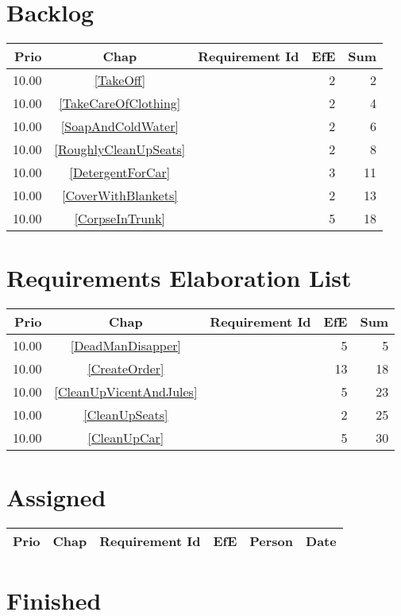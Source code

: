 \section{Backlog}
\begin{longtable}{|r|c|p{7cm}||r|r|} \hline
\textbf{Prio} & \textbf{Chap} & \textbf{Requirement Id} & \textbf{EfE} & \textbf{Sum} \\ \hline\endhead
10.00 & \ref{TakeOff} & \nameref{TakeOff} & 2 & 2 \\ \hline
10.00 & \ref{TakeCareOfClothing} & \nameref{TakeCareOfClothing} & 2 & 4 \\ \hline
10.00 & \ref{SoapAndColdWater} & \nameref{SoapAndColdWater} & 2 & 6 \\ \hline
10.00 & \ref{RoughlyCleanUpSeats} & \nameref{RoughlyCleanUpSeats} & 2 & 8 \\ \hline
10.00 & \ref{DetergentForCar} & \nameref{DetergentForCar} & 3 & 11 \\ \hline
10.00 & \ref{CoverWithBlankets} & \nameref{CoverWithBlankets} & 2 & 13 \\ \hline
10.00 & \ref{CorpseInTrunk} & \nameref{CorpseInTrunk} & 5 & 18 \\ \hline
\end{longtable}\section{Requirements Elaboration List}
\begin{longtable}{|r|c|p{7cm}||r|r|} \hline
\textbf{Prio} & \textbf{Chap} & \textbf{Requirement Id} & \textbf{EfE} & \textbf{Sum} \\ \hline\endhead
10.00 & \ref{DeadManDisapper} & \nameref{DeadManDisapper} & 5 & 5 \\ \hline
10.00 & \ref{CreateOrder} & \nameref{CreateOrder} & 13 & 18 \\ \hline
10.00 & \ref{CleanUpVicentAndJules} & \nameref{CleanUpVicentAndJules} & 5 & 23 \\ \hline
10.00 & \ref{CleanUpSeats} & \nameref{CleanUpSeats} & 2 & 25 \\ \hline
10.00 & \ref{CleanUpCar} & \nameref{CleanUpCar} & 5 & 30 \\ \hline
\end{longtable}\section{Assigned}
\begin{longtable}{|r|c|p{6.5cm}||r|l|l|} \hline
\textbf{Prio} & \textbf{Chap} & \textbf{Requirement Id} & \textbf{EfE} & \textbf{Person} & \textbf{Date} \\ \hline\endhead
\end{longtable}\section{Finished}

